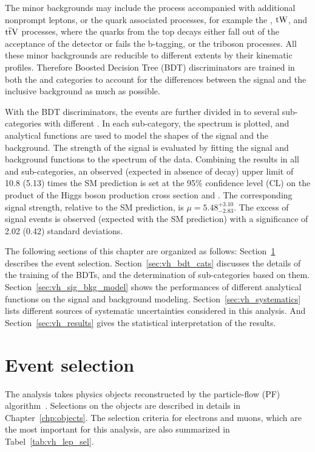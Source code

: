 The minor backgrounds may include the \DY process accompanied with additional nonprompt leptons, or the \Pqt quark associated processes, 
for example the \ttbar, $\mathrm{t}\mathrm{W}$, and $\mathrm{t}\overline{\mathrm{t}}\mathrm{V}$ processes, where the \Pqb quarks from the top decays either fall out of the acceptance of the detector or fails the b-tagging,
or the triboson processes. 
All these minor backgrounds are reducible to different extents by their kinematic profiles. 
Therefore Boosted Decision Tree (BDT) discriminators are trained in both the \WH and \ZH categories to account for the differences between the signal and the inclusive background as much as possible.

With the BDT discriminators, the events are further divided in to several sub-categories with different \SoB. 
In each sub-category, the \mmm spectrum is plotted, and analytical functions are used to model the shapes of the signal and the background.
The strength of the \hmm signal is evaluated by fitting the signal and background functions to the \mmm spectrum of the data.
Combining the results in all \WH and \ZH sub-categories, an observed (expected in absence of \hmm decay) upper limit of 10.8 (5.13) times the SM prediction 
is set at the 95\% confidence level (CL) on the product of the Higgs boson production cross section and \brhmm.
The corresponding signal strength, relative to the SM prediction, is $\mu = 5.48^{+3.10}_{-2.83}$.
The excess of signal events is observed (expected with the SM prediction) with a significance of 2.02 (0.42) standard deviations.

The following sections of this chapter are organized as follows: Section~\ref{sec:vh_event_selection} describes the event selection. 
Section~\ref{sec:vh_bdt_cats} discusses the details of the training of the BDTs, and the determination of sub-categories based on them.
Section~\ref{sec:vh_sig_bkg_model} shows the performances of different analytical functions on the signal and background modeling.
Section~\ref{sec:vh_systematics} lists different sources of systematic uncertainties considered in this analysis.
And Section~\ref{sec:vh_results} gives the statistical interpretation of the results.


\section{Event selection}\label{sec:vh_event_selection}
The \VH analysis takes physics objects reconstructed by the particle-flow (PF) algorithm~\cite{Sirunyan_2017}.
Selections on the objects are described in details in Chapter~\ref{chp:objects}.
The selection criteria for electrons and muons, which are the most important for this analysis, are also summarized in Tabel~\ref{tab:vh_lep_sel}.

